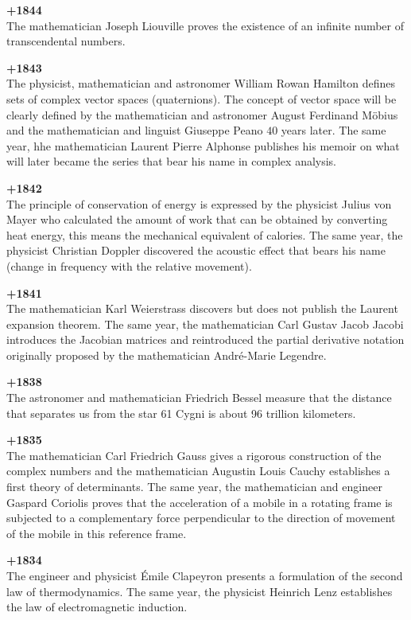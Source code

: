 \textbf{+1844}\\
The mathematician Joseph Liouville proves the existence of an infinite number of transcendental numbers.

\textbf{+1843}\\
The physicist, mathematician and astronomer William Rowan Hamilton defines sets of complex vector spaces (quaternions). The concept of vector space will be clearly defined by the mathematician and astronomer August Ferdinand Möbius and the mathematician and linguist Giuseppe Peano $40$ years later. The same year, hhe mathematician Laurent Pierre Alphonse publishes his memoir on what will later became the series that bear his name in complex analysis.

\textbf{+1842}\\
The principle of conservation of energy is expressed by the physicist Julius von Mayer who calculated the amount of work that can be obtained by converting heat energy, this means the mechanical equivalent of calories. The same year, the physicist Christian Doppler discovered the acoustic effect that bears his name (change in frequency with the relative movement).

\textbf{+1841}\\
The mathematician Karl Weierstrass discovers but does not publish the Laurent expansion theorem. The same year, the mathematician Carl Gustav Jacob Jacobi introduces the Jacobian matrices and reintroduced the partial derivative notation originally proposed by the mathematician André-Marie Legendre.

\textbf{+1838}\\
The astronomer and mathematician Friedrich Bessel measure that the distance that separates us from the star 61 Cygni is about 96 trillion kilometers.

\textbf{+1835}\\
The mathematician Carl Friedrich Gauss gives a rigorous construction of the complex numbers and the mathematician Augustin Louis Cauchy establishes a first theory of determinants. The same year, the mathematician and engineer Gaspard Coriolis proves that the acceleration of a mobile in a rotating frame is subjected to a complementary force perpendicular to the direction of movement of the mobile in this reference frame.

\textbf{+1834}\\
The engineer and physicist Émile Clapeyron presents a formulation of the second law of thermodynamics. The same year, the physicist Heinrich Lenz establishes the law of electromagnetic induction.

